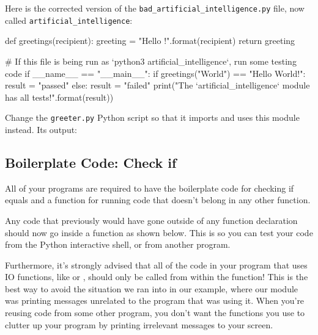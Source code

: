 \documentclass[11pt]{cselabheader}
\begin{document}
{Here is the corrected version of the \texttt{bad\_artificial\_intelligence.py}
file, now called \texttt{artificial\_intelligence}:

\begin{python3code}
def greetings(recipient):
    greeting = "Hello {}!".format(recipient)
    return greeting

# If this file is being run as `python3 artificial_intelligence`, run some testing code
if __name__ == "__main__":
    if greetings("World") == "Hello World!":
        result = "passed"
    else:
        result = "failed"
    print("The `artificial_intelligence` module has {} all tests!".format(result))
\end{python3code}

Change the \texttt{greeter.py} Python script so that it imports and uses
this module instead. Its output:



\subsection{Boilerplate Code: Check if }\label{boilerplate}

All of your programs are required to have the boilerplate code for
checking if  equals 
and a  function for running code that doesn't
belong in any other function.

Any code that previously would have gone outside of any function declaration
should now go inside a  function as shown below.  This is so
you can test your  code from the Python interactive shell, or
from another program.

Furthermore, it's strongly advised that all of the code in your program that
uses IO functions, like  or , should
only be called from within the  function! This is the best
way to avoid the situation we ran into in our example, where our module was
printing messages unrelated to the program that was using it. When you're
reusing code from some other program, you don't want the functions you use to
clutter up your program by printing irrelevant messages to your screen.

}
\end{document}
